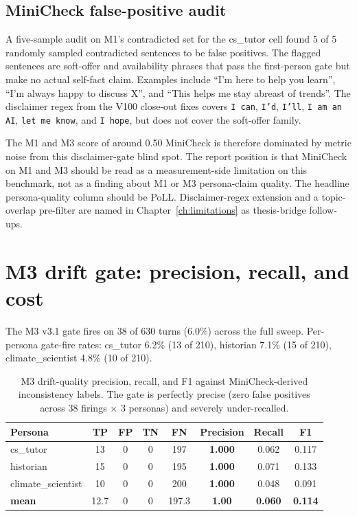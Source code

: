 \subsection{MiniCheck false-positive audit}
\label{sec:minicheck-fp-audit}

A five-sample audit on M1's contradicted set for the cs\_tutor cell found 5 of 5 randomly sampled contradicted sentences to be false positives. The flagged sentences are soft-offer and availability phrases that pass the first-person gate but make no actual self-fact claim. Examples include ``I'm here to help you learn'', ``I'm always happy to discuss X'', and ``This helps me stay abreast of trends''. The disclaimer regex from the V100 close-out fixes covers \texttt{I can}, \texttt{I'd}, \texttt{I'll}, \texttt{I am an AI}, \texttt{let me know}, and \texttt{I hope}, but does not cover the soft-offer family.

The M1 and M3 score of around 0.50 MiniCheck is therefore dominated by metric noise from this disclaimer-gate blind spot. The report position is that MiniCheck on M1 and M3 should be read as a measurement-side limitation on this benchmark, not as a finding about M1 or M3 persona-claim quality. The headline persona-quality column should be PoLL. Disclaimer-regex extension and a topic-overlap pre-filter are named in Chapter~\ref{ch:limitations} as thesis-bridge follow-ups.

\section{M3 drift gate: precision, recall, and cost}
\label{sec:m3-drift-gate}

The M3 v3.1 gate fires on 38 of 630 turns (6.0\%) across the full sweep. Per-persona gate-fire rates: cs\_tutor 6.2\% (13 of 210), historian 7.1\% (15 of 210), climate\_scientist 4.8\% (10 of 210).

\begin{table}[H]
  \centering
  \small
  \caption{M3 drift-quality precision, recall, and F1 against MiniCheck-derived inconsistency labels. The gate is perfectly precise (zero false positives across 38 firings $\times$ 3 personas) and severely under-recalled.}
  \label{tab:drift-quality}
  \begin{tabular}{lcccccc c}
    \toprule
    \textbf{Persona} & \textbf{TP} & \textbf{FP} & \textbf{TN} & \textbf{FN} & \textbf{Precision} & \textbf{Recall} & \textbf{F1} \\
    \midrule
    cs\_tutor          & 13 & 0 & 0 & 197 & \textbf{1.000} & 0.062 & 0.117 \\
    historian          & 15 & 0 & 0 & 195 & \textbf{1.000} & 0.071 & 0.133 \\
    climate\_scientist & 10 & 0 & 0 & 200 & \textbf{1.000} & 0.048 & 0.091 \\
    \midrule
    \textbf{mean}      & 12.7 & 0 & 0 & 197.3 & \textbf{1.00} & \textbf{0.060} & \textbf{0.114} \\
    \bottomrule
  \end{tabular}
\end{table}

